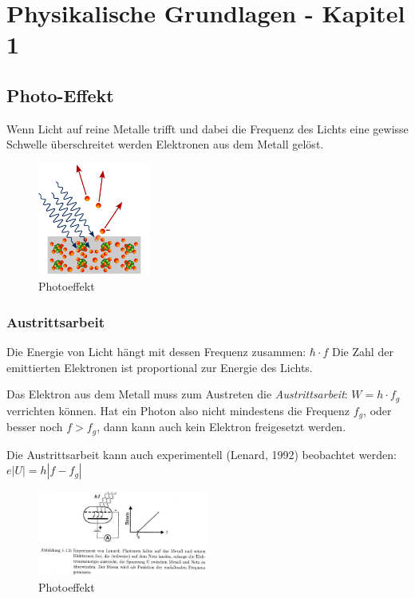 \documentclass{article}
\begin{document}
\section{Physikalische Grundlagen - Kapitel 1}
\subsection{Photo-Effekt }\label{k1:photoEf}
Wenn Licht auf reine Metalle trifft und dabei die Frequenz des Lichts eine gewisse Schwelle überschreitet werden Elektronen aus dem Metall gelöst.

\begin{figure}[H]
    \centering
    \includegraphics[width=0.33\textwidth]{fig/photoeffect}
    \caption{Photoeffekt}
    \label{fig:photoeffect}
\end{figure}

\subsubsection{Austrittsarbeit}
Die Energie von Licht hängt mit dessen Frequenz zusammen: $\hbar \cdot f$
Die Zahl der emittierten Elektronen ist proportional zur Energie des Lichts.

Das Elektron aus dem Metall muss zum Austreten die \textit{Austrittsarbeit}: $W = h \cdot f_g$ verrichten können.
Hat ein Photon also nicht mindestens die Frequenz $f_g$, oder besser noch $f > f_g$, dann kann auch kein Elektron freigesetzt werden.

Die Austrittsarbeit kann auch experimentell (Lenard, 1992) beobachtet werden: $e|U| = h| f - f_g|$
\begin{figure}[H]
    \centering
    \includegraphics[width=0.5\textwidth]{fig/photoExperiment}
    \caption{Photoeffekt}
    \label{fig:photoeffectExperiment}
\end{figure}
\end{document}
